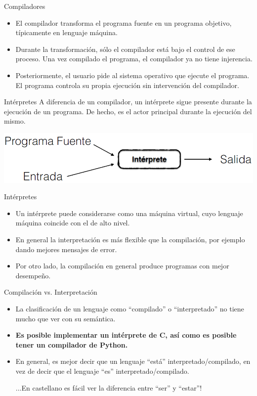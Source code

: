 \documentclass{beamer} %
\begin{document}
\begin{frame}{Compiladores}
    \begin{itemize}
      \item El compilador transforma el programa fuente en un programa objetivo, típicamente en lenguaje máquina.
      \item Durante la transformación, sólo el compilador está bajo el control de ese proceso. Una vez compilado el programa, el compilador ya no tiene injerencia.
      \item Posteriormente, el usuario pide al sistema operativo que ejecute el programa. El programa controla su propia ejecución sin intervención del compilador.
    \end{itemize}
\end{frame}

\begin{frame}{Intérpretes}
    A diferencia de un compilador, un intérprete sigue presente durante la ejecución de un programa. De hecho, es el actor principal durante la ejecución del mismo.
    \begin{center}
      \includegraphics[width=.8\textwidth]{./image/cap1/interprete}
    \end{center}
\end{frame}

\begin{frame}{Intérpretes}
    \begin{itemize}
      \item Un intérprete puede considerarse como una máquina virtual, cuyo lenguaje máquina coincide con el de alto nivel.
      \item En general la interpretación es más flexible que la compilación, por ejemplo dando mejores mensajes de error.
      \item Por otro lado, la compilación en general produce programas con mejor desempeño.
    \end{itemize}
\end{frame}

\begin{frame}{Compilación vs. Interpretación}
    \begin{itemize}
      \item La clasificación de un lenguaje como ``compilado'' o ``interpretado'' no tiene mucho que ver con su semántica.
      \item \textbf{Es posible implementar un intérprete de C, así como es
posible tener un compilador de Python.}
      \item En general, es mejor decir que un lenguaje ``está'' interpretado/compilado, en vez de decir que el lenguaje ``es'' interpretado/compilado.
      \begin{flushright}
      \scriptsize{...En castellano es fácil ver la diferencia entre ``ser'' y ``estar''!}
      \end{flushright}
    \end{itemize}
\end{frame}
\end{document}

